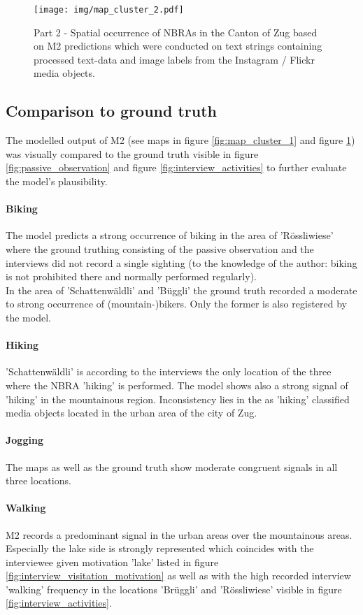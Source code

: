 \begin{figure}[h!]
   \centering
   \texttt{[image: img/map\_cluster\_2.pdf]}
   \caption{Part 2 - Spatial occurrence of NBRAs in the Canton of Zug based on M2 predictions which were conducted on text strings containing processed text-data and image labels from the Instagram / Flickr media objects.}
   \label{fig:map_cluster_2}
\end{figure}

\subsection{Comparison to ground truth}
The modelled output of M2 (see maps in figure \ref{fig:map_cluster_1} and figure \ref{fig:map_cluster_2}) was visually compared to the ground truth visible in figure \ref{fig:passive_observation} and figure \ref{fig:interview_activities} to further evaluate the model's plausibility.

\paragraph*{Biking}
The model predicts a strong occurrence of biking in the area of 'R\"ossliwiese' where the ground truthing consisting of the passive observation and the interviews did not record a single sighting (to the knowledge of the author: biking is not prohibited there and normally performed regularly).\\
In the area of 'Schattenw\"aldli' and 'B\"uggli' the ground truth recorded a moderate to strong occurrence of (mountain-)bikers. Only the former is also registered by the model. 

\paragraph*{Hiking}
'Schattenw\"aldli' is according to the interviews the only location of the three where the NBRA 'hiking' is performed. The model shows also a strong signal of 'hiking' in the mountainous region. Inconsistency lies in the as 'hiking' classified media objects located in the urban area of the city of Zug.

\paragraph*{Jogging}
The maps as well as the ground truth show moderate congruent signals in all three locations.

\paragraph*{Walking}
M2 records a predominant signal in the urban areas over the mountainous areas. Especially the lake side is strongly represented which coincides with the interviewee given motivation 'lake' listed in figure \ref{fig:interview_visitation_motivation} as well as with the high recorded interview 'walking' frequency in the locations 'Br\"uggli' and 'R\"ossliwiese' visible in figure \ref{fig:interview_activities}.

